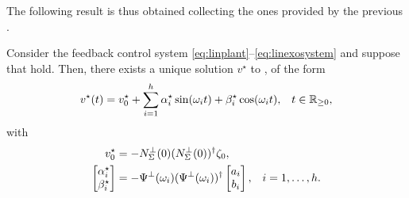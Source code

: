 The following result is thus obtained collecting the ones provided by the previous .

\begin{theorem}
	\label{thm:lqrall_solution}
	Consider the feedback control system \eqref{eq:linplant}--\eqref{eq:linexosystem} and suppose that  hold. Then, there exists a unique solution $v^{\star}$ to , of the form
	\begin{align}
		\label{eq:lqrall_optsol}
		v^{\star}(t) &= v_0^\star+ \sum_{i=1}^h \alpha^{\star}_i\sin(\omega_i t)+\beta^{\star}_i\cos(\omega_i t), & t\in\mathbb{R}_{\geq 0},
	\end{align}
	with
  \begin{subequations}
    \begin{align}
      v_0^\star & =-N_\Sigma^{\perp}(0)(N_\Sigma^{\perp}(0))^{\dagger}\zeta_0, \\
      \begin{bmatrix}
				\alpha^{\star}_i \\
				\beta^{\star}_i
      \end{bmatrix} &= -\Psi^{\perp}(\omega_i)(\Psi^{\perp}(\omega_i))^{\dagger}
      \begin{bmatrix}
				a_i \\
				b_i
      \end{bmatrix}, & i=1,\dotsc,h.
    \end{align}
  \end{subequations}
  \closestatement
\end{theorem}

